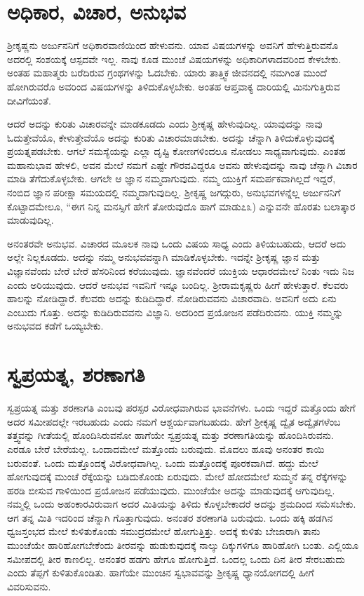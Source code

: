 \section*{ಅಧಿಕಾರ, ವಿಚಾರ, ಅನುಭವ}

ಶ‍್ರೀಕೃಷ್ಣನು ಅರ್ಜುನನಿಗೆ ಅಧಿಕಾರವಾಣಿಯಿಂದ ಹೇಳುವನು. ಯಾವ ವಿಷಯಗಳನ್ನು ಅವನಿಗೆ ಹೇಳುತ್ತಿರುವನೊ ಅದರಲ್ಲಿ ಸಂಶಯಕ್ಕೆ ಆಸ್ಪದವೇ ಇಲ್ಲ. ನಾವು ಕೂಡ ಮುಂಚೆ ವಿಷಯಗಳನ್ನು ಅಧಿಕಾರಿಗಳಾದವರಿಂದ ಕೇಳಬೇಕು. ಅಂತಹ ಮಹಾತ್ಮರು ಬರೆದಿರುವ ಗ್ರಂಥಗಳನ್ನು ಓದಬೇಕು. ಯಾರು ತಾತ್ತ್ವಿಕ ಜೀವನದಲ್ಲಿ ನಮಗಿಂತ ಮುಂದೆ ಹೋಗಿರುವರೊ ಅವರಿಂದ ವಿಷಯಗಳನ್ನು ತಿಳಿದುಕೊಳ್ಳಬೇಕು. ಅಂತಹ ಆಪ್ತವಾಕ್ಯ ದಾರಿಯಲ್ಲಿ ಮಿನುಗುತ್ತಿರುವ ದೀವಿಗೆಯಂತೆ.

ಆದರೆ ಅದನ್ನು ಕುರಿತು ವಿಚಾರವನ್ನೇ ಮಾಡಕೂಡದು ಎಂದು ಶ‍್ರೀಕೃಷ್ಣ ಹೇಳುವುದಿಲ್ಲ. ಯಾವುದನ್ನು ನಾವು ಓದುತ್ತೇವೆಯೊ, ಕೇಳುತ್ತೇವೆಯೊ ಅದನ್ನು ಕುರಿತು ವಿಚಾರಮಾಡಬೇಕು. ಅದನ್ನು ಚೆನ್ನಾಗಿ ತಿಳಿದುಕೊಳ್ಳುವುದಕ್ಕೆ ಪ್ರಯತ್ನಪಡಬೇಕು. ಆಗಲೆ ಸಮಸ್ಯೆಯನ್ನು ಎಲ್ಲಾ ದೃಷ್ಟಿ ಕೋಣಗಳಿಂದಲೂ ನೋಡಲು ಸಾಧ್ಯವಾಗುವುದು. ಎಂತಹ ಮಹಾನುಭಾವ ಹೇಳಲಿ, ಅವನ ಮೇಲೆ ನಮಗೆ ಎಷ್ಟೇ ಗೌರವವಿದ್ದರೂ ಅವನು ಹೇಳುವುದನ್ನು ನಾವು ಚೆನ್ನಾಗಿ ವಿಚಾರ ಮಾಡಿ ತೆಗೆದುಕೊಳ್ಳಬೇಕು. ಆಗಲೇ ಆ ಜ್ಞಾನ ನಮ್ಮದಾಗುವುದು. ನಮ್ಮ ಯುಕ್ತಿಗೆ ಸಮರ್ಪಕವಾಗಿಲ್ಲದೆ ಇದ್ದರೆ, ನಂಬಿದ ಜ್ಞಾನ ಪರೀಕ್ಷಾ ಸಮಯದಲ್ಲಿ ನಮ್ಮದಾಗುವುದಿಲ್ಲ. ಶ‍್ರೀಕೃಷ್ಣ ಜಗದ್ಗುರು, ಅನುಭವಗಳನ್ನೆಲ್ಲ ಅರ್ಜುನನಿಗೆ ಕೊಟ್ಟಾದಮೇಲೂ, “ಈಗ ನಿನ್ನ ಮನಸ್ಸಿಗೆ ಹೇಗೆ ತೋರುವುದೊ ಹಾಗೆ ಮಾಡು೭೩) ಎನ್ನುವನೇ ಹೊರತು ಬಲಾತ್ಕಾರ ಮಾಡುವುದಿಲ್ಲ.

ಅನಂತರವೇ ಅನುಭವ. ವಿಚಾರದ ಮೂಲಕ ನಾವು ಒಂದು ವಿಷಯ ಸಾಧ್ಯ ಎಂದು ತಿಳಿಯಬಹುದು, ಆದರೆ ಅದು ಅಲ್ಲೇ ನಿಲ್ಲಕೂಡದು. ಅದನ್ನು ನಮ್ಮ ಅನುಭವವನ್ನಾಗಿ ಮಾಡಿಕೊಳ್ಳಬೇಕು. ಇದನ್ನೇ ಶ‍್ರೀಕೃಷ್ಣ ಜ್ಞಾನ ಮತ್ತು ವಿಜ್ಞಾನವೆಂದು ಬೇರೆ ಬೇರೆ ಹೆಸರಿನಿಂದ ಕರೆಯುವುದು. ಜ್ಞಾನವೆಂದರೆ ಯುಕ್ತಿಯ ಆಧಾರದಮೇಲೆ ನಿಂತು ಇದು ನಿಜ ಎಂದು ಅರಿಯುವುದು. ಆದರೆ ಅನುಭವ ಇವನಿಗೆ ಇನ್ನೂ ಬಂದಿಲ್ಲ. ಶ‍್ರೀರಾಮಕೃಷ್ಣರು ಹೀಗೆ ಹೇಳುತ್ತಾರೆ. ಕೆಲವರು ಹಾಲನ್ನು ನೋಡಿದ್ದಾರೆ. ಕೆಲವರು ಅದನ್ನು ಕುಡಿದಿದ್ದಾರೆ. ನೋಡಿರುವವನು ವಿಚಾರವಾದಿ. ಅವನಿಗೆ ಅದು ಏನು ಎಂಬುದು ಗೊತ್ತು. ಅದನ್ನು ಕುಡಿದಿರುವವನು ವಿಜ್ಞಾನಿ. ಅದರಿಂದ ಪ್ರಯೋಜನ ಪಡೆದಿರುವನು. ಯುಕ್ತಿ ನಮ್ಮನ್ನು ಅನುಭವದ ಕಡೆಗೆ ಒಯ್ಯಬೇಕು.


\section*{ಸ್ವಪ್ರಯತ್ನ, ಶರಣಾಗತಿ}

\vskip -7.5pt

ಸ್ವಪ್ರಯತ್ನ ಮತ್ತು ಶರಣಾಗತಿ ಎಂಬವು ಪರಸ್ಪರ ವಿರೋಧವಾಗಿರುವ ಭಾವನೆಗಳು. ಒಂದು ಇದ್ದರೆ ಮತ್ತೊಂದು ಹೇಗೆ ಅದರ ಸಮೀಪದಲ್ಲೇ ಇರಬಹುದು ಎಂದು ನಮಗೆ ಆಶ್ಚರ್ಯವಾಗಬಹುದು. ಹೇಗೆ ಶ‍್ರೀಕೃಷ್ಣ ದ್ವೈತ ಅದ್ವೈತಗಳೆಂಬ ತತ್ತ್ವವನ್ನು ಗೀತೆಯಲ್ಲಿ ಹೊಂದಿಸಿರುವನೋ ಹಾಗೆಯೇ ಸ್ವಪ್ರಯತ್ನ ಮತ್ತು ಶರಣಾಗತಿಯನ್ನು ಹೊಂದಿಸಿರುವನು. ಎರಡೂ ಬೇರೆ ಬೇರೆಯಲ್ಲ. ಒಂದಾದಮೇಲೆ ಮತ್ತೊಂದು ಬರುವುದು. ಮೊದಲು ಹೂವು ಅನಂತರ ಕಾಯಿ ಬರುವಂತೆ. ಒಂದು ಮತ್ತೊಂದಕ್ಕೆ ವಿರೋಧವಾಗಿಲ್ಲ. ಒಂದು ಮತ್ತೊಂದಕ್ಕೆ ಪೂರಕವಾಗಿದೆ. ಹದ್ದು ಮೇಲೆ ಹೋಗುವುದಕ್ಕೆ ಮುಂಚೆ ರೆಕ್ಕೆಯನ್ನು ಬಡಿದುಕೊಂಡು ಏರುವುದು. ಮೇಲೆ ಹೋದಮೇಲೆ ಸುಮ್ಮನೆ ತನ್ನ ರೆಕ್ಕೆಗಳನ್ನು ಹರಡಿ ಬೀಸುವ ಗಾಳಿಯಿಂದ ಪ್ರಯೋಜನ ಪಡೆಯುವುದು. ಮುಂಚೆಯೇ ಅದನ್ನು ಮಾಡುವುದಕ್ಕೆ ಆಗುವುದಿಲ್ಲ. ನಮ್ಮಲ್ಲಿ ಒಂದು ಅಹಂಕಾರವಿರುವಾಗ ಅದರ ಮಿತಿಯನ್ನು ತಿಳಿದು ಕೊಳ್ಳಬೇಕಾದರೆ ಅದನ್ನು ಶ್ರಮದಿಂದ ಸಮೆಸಬೇಕು. ಆಗ ತನ್ನ ಮಿತಿ ಇದರಿಂದ ಚೆನ್ನಾಗಿ ಗೊತ್ತಾಗುವುದು. ಅನಂತರ ಶರಣಾಗತಿ ಬರುವುದು. ಒಂದು ಹಕ್ಕಿ ಹಡಗಿನ ಧ್ವಜಸ್ತಂಭದ ಮೇಲೆ ಕುಳಿತುಕೊಂಡು ಸಮುದ್ರದಮೇಲೆ ಹೋಗುತ್ತಿತ್ತು. ಅದಕ್ಕೆ ಕುಳಿತು ಬೇಜಾರಾಗಿ ತಾನು ಮುಂಚೆಯೇ ಹಾರಿಹೋಗಬೇಕೆಂದು ತೀರವನ್ನು ಹುಡುಕುವುದಕ್ಕೆ ನಾಲ್ಕು ದಿಕ್ಕುಗಳಿಗೂ ಹಾರಿಹೋಗಿ ಬಂತು. ಎಲ್ಲಿಯೂ ಸಮೀಪದಲ್ಲಿ ತೀರ ಕಾಣಲಿಲ್ಲ. ಅನಂತರ ಹಡಗು ಹೇಗೂ ಹೋಗುತ್ತಿದೆ. ಒಂದಲ್ಲ ಒಂದು ದಿನ ತೀರ ಸೇರಬಹುದು ಎಂದು ತೆಪ್ಪಗೆ ಕುಳಿತುಕೊಂಡಿತು. ಹಾಗೆಯೇ ಮುಂಚಿನ ಸ್ವಭಾವವನ್ನು ಶ‍್ರೀಕೃಷ್ಣ ಧ್ಯಾನಯೋಗದಲ್ಲಿ ಹೀಗೆ ವಿವರಿಸುವನು.

